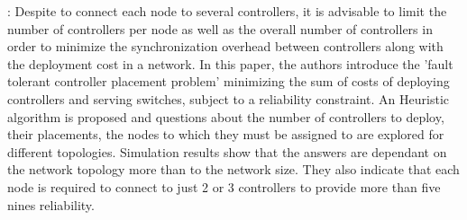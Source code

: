 \documentclass[a4paper,10pt]{article}
\begin{document}

\cite{RoRu14}: Despite to connect each node to several controllers, it is advisable to limit the number of controllers per node as well as the overall number of controllers in order to minimize the synchronization overhead between controllers  along with the deployment cost in a network. In this paper, the authors introduce the 'fault tolerant controller placement problem' minimizing the sum of costs of deploying controllers and serving switches, subject to a reliability constraint. An Heuristic algorithm is proposed and questions about the number of controllers to deploy, their placements, the nodes to which they must be assigned to are explored for different topologies. Simulation results show that the answers are dependant on the network topology more than to the network size. They also indicate that each node is required to connect to just 2 or 3 controllers to provide more than five nines reliability.

\end{document}
